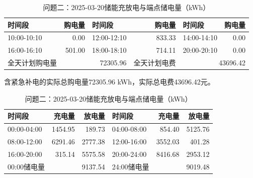\begin{table}[H]\centering\small\setlength{\tabcolsep}{5pt}
\caption{问题二：2025-03-20购电结果（电量：kWh；费用：元）}
\begin{tabular}{lrlrlr}\toprule
时间段 & 购电量 & 时间段 & 购电量 & 时间段 & 购电量 \\\midrule
10:00-10:10 & 0.00 & 12:00-12:10 & 833.33 & 14:00-14:10 & 0.00\\
16:00-16:10 & 501.00 & 18:00-18:10 & 714.11 & 20:00-20:10 & 0.00\\
\midrule 全天计划购电量 & \multicolumn{2}{r}{72305.96} & 全天计划电费 & \multicolumn{2}{r}{43696.42}\\\bottomrule
\end{tabular}
\par\vspace{2pt}\footnotesize
含紧急补电的实际总购电量72305.96 kWh，实际总电费43696.42元。
\vspace{3pt}\small
\caption{问题二：2025-03-20储能充放电与端点储电量（kWh）}
\begin{tabular}{lrrlrr}\toprule
时间段 & 充电量 & 放电量 & 时间段 & 充电量 & 放电量 \\\midrule
00:00-04:00 & 1454.95 & 189.73 & 04:00-08:00 & 854.40 & 5125.76\\
08:00-12:00 & 6291.46 & 2777.38 & 12:00-16:00 & 3552.03 & 401.28\\
16:00-20:00 & 315.14 & 5575.58 & 20:00-24:00 & 8416.68 & 2953.12\\
\midrule 00:00储电量 & \multicolumn{2}{r}{9137.54} & 24:00储电量 & \multicolumn{2}{r}{9019.48}\\\bottomrule
\end{tabular}\end{table}
